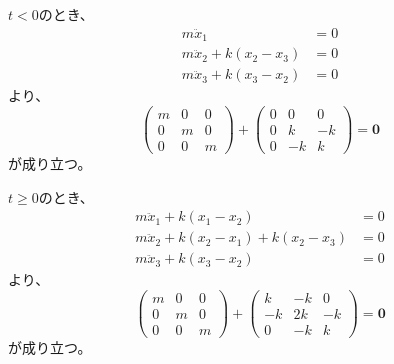 \documentclass[a4paper]{jsarticle}
\begin{document}
\section{}
\subsection{}
$t < 0$のとき、
\begin{equation}
  \begin{aligned}
    m \ddot{x}_1 &= 0 \\
    m \ddot{x}_2 + k (x_2 - x_3) &= 0 \\
    m \ddot{x}_3 + k (x_3 - x_2) &= 0
  \end{aligned}
\end{equation}
より、
\begin{equation}
  \begin{pmatrix}
    m & 0 & 0 \\
    0 & m & 0 \\
    0 & 0 & m
  \end{pmatrix} +
  \begin{pmatrix}
    0 & 0 & 0 \\
    0 & k & -k \\
    0 & -k & k
  \end{pmatrix} = \boldsymbol{0}
\end{equation}
が成り立つ。\par
$t \geq 0$のとき、
\begin{equation}
  \begin{aligned}
    m \ddot{x}_1 + k (x_1 - x_2) &= 0 \\
    m \ddot{x}_2 + k (x_2 - x_1) + k (x_2 - x_3) &= 0 \\
    m \ddot{x}_3 + k (x_3 - x_2) &= 0
  \end{aligned}
\end{equation}
より、
\begin{equation}
  \begin{pmatrix}
    m & 0 & 0 \\
    0 & m & 0 \\
    0 & 0 & m
  \end{pmatrix} +
  \begin{pmatrix}
    k & -k & 0 \\
    -k & 2k & -k \\
    0 & -k & k
  \end{pmatrix} = \boldsymbol{0}
\end{equation}
が成り立つ。
\end{document}
